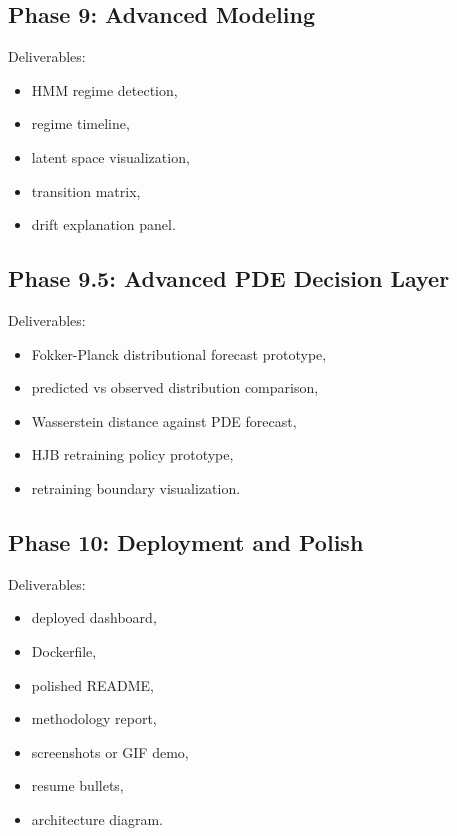 \documentclass[11pt]{article}
\begin{document}
\subsection{Phase 9: Advanced Modeling}

Deliverables:

\begin{itemize}
    \item HMM regime detection,
    \item regime timeline,
    \item latent space visualization,
    \item transition matrix,
    \item drift explanation panel.
\end{itemize}

\subsection{Phase 9.5: Advanced PDE Decision Layer}

Deliverables:

\begin{itemize}
    \item Fokker-Planck distributional forecast prototype,
    \item predicted vs observed distribution comparison,
    \item Wasserstein distance against PDE forecast,
    \item HJB retraining policy prototype,
    \item retraining boundary visualization.
\end{itemize}

\subsection{Phase 10: Deployment and Polish}

Deliverables:

\begin{itemize}
    \item deployed dashboard,
    \item Dockerfile,
    \item polished README,
    \item methodology report,
    \item screenshots or GIF demo,
    \item resume bullets,
    \item architecture diagram.
\end{itemize}
\end{document}
